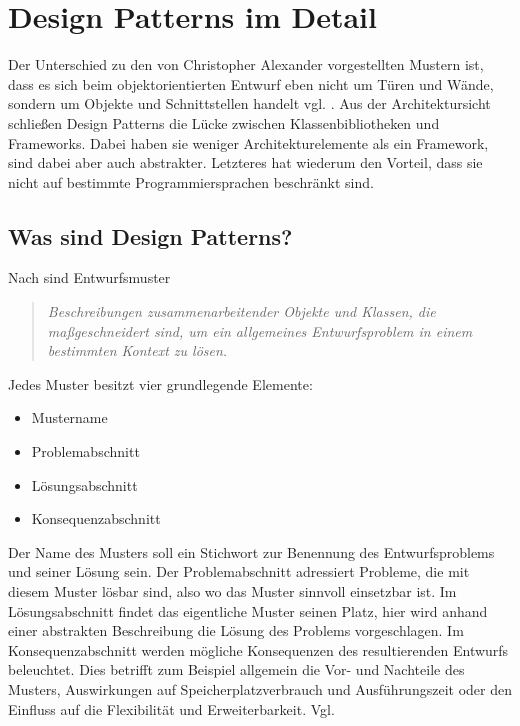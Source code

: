 \documentclass[fontsize=11pt,a4paper,final]{scrreprt}[2003/01/01]
\begin{document}
\chapter{Design Patterns im Detail}\label{se:Design Patterns im Detail}
Der Unterschied zu den von Christopher Alexander vorgestellten Mustern ist, dass es sich beim objektorientierten Entwurf eben nicht um Türen und Wände, sondern um Objekte und Schnittstellen handelt vgl. \cite[S. 3]{gamma2004}.
Aus der Architektursicht schließen Design Patterns die Lücke zwischen Klassenbibliotheken und Frameworks. Dabei haben sie weniger Architekturelemente als ein Framework, sind dabei aber auch abstrakter. Letzteres hat wiederum den Vorteil, dass sie nicht auf bestimmte Programmiersprachen beschränkt sind.

\section{Was sind Design Patterns?}\label{se:Was sind Design Patterns?}

Nach \cite[S. 4]{gamma2004} sind Entwurfsmuster 

\begin{quote}
	\textit{\glqq Beschreibungen zusammenarbeitender Objekte und Klassen, die maßgeschneidert sind, um ein allgemeines Entwurfsproblem in einem bestimmten Kontext zu lösen\grqq.}
\end{quote} 
\smallskip
Jedes Muster besitzt vier grundlegende Elemente:
\begin{itemize}
	\item Mustername
	\item Problemabschnitt
	\item Lösungsabschnitt
	\item Konsequenzabschnitt
\end{itemize}

Der Name des Musters soll ein Stichwort zur Benennung des Entwurfsproblems und seiner Lösung sein. Der Problemabschnitt adressiert Probleme, die mit diesem Muster lösbar sind, also wo das Muster sinnvoll einsetzbar ist. Im Lösungsabschnitt findet das eigentliche Muster seinen Platz, hier wird anhand einer abstrakten Beschreibung die Lösung des Problems vorgeschlagen. Im Konsequenzabschnitt werden mögliche Konsequenzen des resultierenden Entwurfs beleuchtet. Dies betrifft zum Beispiel allgemein die Vor- und Nachteile des Musters, Auswirkungen auf Speicherplatzverbrauch und Ausführungszeit oder den Einfluss auf die Flexibilität und Erweiterbarkeit. Vgl. \cite[S. 3 - 4]{gamma2004}
\end{document}
